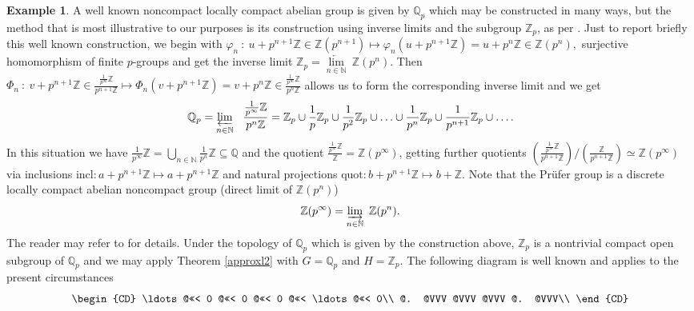 \documentclass{amsart}
\theoremstyle{definition}
\newtheorem{example}[theorem]{Example}
\numberwithin{equation}{section}
\newcommand{\Z}{\mathbb{Z}}
\newcommand{\Qp}{\mathbb{Q}_p}
\newcommand{\Zp}{\mathbb{Z}_p}
\begin{document}
\begin{example}A well known noncompact locally compact abelian group  is given by $\Qp$ which  may be constructed in many ways, but the method that is most illustrative to our purposes is its construction using inverse limits and the subgroup $\Zp$, as per \cite[Exercise E1.16]{hofmann}.  Just to report briefly this well known construction, we begin with  
 $\varphi_{n} \ : \  u+p^{n+1}\mathbb{Z} \in \mathbb{Z}(p^{n+1}) \longmapsto \varphi_{n}(u+p^{n+1}\mathbb{Z})= u+p^{n}\mathbb{Z} \in \mathbb{Z}(p^{n}),$
  surjective homomorphism  of finite $p$-groups  and get the inverse limit      $\mathbb{Z}_{p}=\underset{n\in\mathbb{N}}{\underleftarrow{\lim}} \ \mathbb{Z}(p^{n}).$ Then
$\Phi_{n} \ : \  v+p^{n+1}\mathbb{Z} \in \frac{\frac{1}{p^{\infty}}\mathbb{Z}}{p^{n+1}\mathbb{Z}} \longmapsto \Phi_{n}(v+p^{n+1}\mathbb{Z})= v+p^{n}\mathbb{Z} \in  \frac{\frac{1}{p^{\infty}}\mathbb{Z}}{p^{n}\mathbb{Z}}$   allows us to form the  corresponding inverse limit and we get \[
 \mathbb{Q}_p=\varprojlim_{n \in \mathbb{N}}   \  \ \frac{\frac{1}{p^\infty} \mathbb{Z} }{ p^n  \mathbb{Z}}=    \mathbb{Z}_p \cup \frac{1}{p} \mathbb{Z}_p \cup  \frac{1}{p^2} \mathbb{Z}_p \cup \ldots \cup \frac{1}{p^n} \mathbb{Z}_p \cup  \frac{1}{p^{n+1}} \mathbb{Z}_p \cup \ldots.
\]In this situation we have
 $\frac{1}{p^{\infty}}\mathbb{Z}=\bigcup_{n \in \mathbb{N}}\frac{1}{p^{n}}\mathbb{Z}\subseteq\mathbb{Q}$ and the quotient
 $ \frac{ \frac{1}{p^\infty}\mathbb{Z}}{\mathbb{Z}}=\mathbb{Z}(p^\infty)$, getting further quotients  $(\frac{ \frac{1}{p^\infty}\mathbb{Z}}{p^{n+1} \mathbb{Z}})/({\frac{ \mathbb{Z}}{p^{n+1}\mathbb{Z}}})   \simeq \mathbb{Z}(p^\infty)$
via inclusions
$\mathrm{incl}    :  a+p^{n+1}\mathbb{Z}   \mapsto a+p^{n+1}\mathbb{Z}$ and natural projections   $\mathrm{quot}  :       b+p^{n+1}\mathbb{Z} \mapsto b+\mathbb{Z}. $ Note that  the Pr\"ufer group is a discrete locally compact abelian noncompact group (direct limit of $\Z(p^n)$)
\[\mathbb{Z}(p^\infty)= \varinjlim_{n \in \mathbb{N}}  \ \mathbb{Z}(p^n). \]
The reader may refer to \cite[Definitions 1.25, 1.27, Lemma 1.26, Exercise E1.16, Example 1.28]{hofmann} for details. Under the topology of $\Qp$ which is given by the construction above,  $\Z_p$ is a nontrivial compact  open subgroup of $\Qp$ and we may apply Theorem \ref{approxl2} with $G=\Qp$ and $H=\Zp$. The following diagram is well known and applies to the present circumstances
\[\begin{CD}
\ldots @<<< 0 @<<< 0 @<<< 0 @<<< \ldots @<<< 0\\
@.  @VVV @VVV @VVV @. @VVV\\

\end{CD}\]
\end{example}
\end{document}

